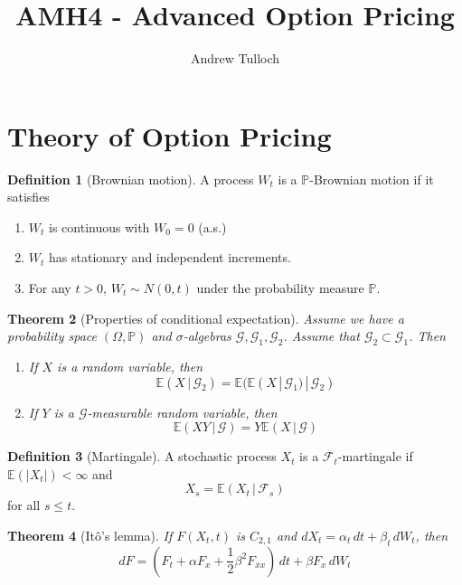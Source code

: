 \documentclass[10pt, oneside, reqno]{amsart}
\title{AMH4 - Advanced Option Pricing}                              %
\author{Andrew Tulloch}
\theoremstyle{plain}%
\newtheorem{thm}{Theorem}[section]
\numberwithin{equation}{section}
\theoremstyle{definition}
\newtheorem{defn}[thm]{Definition}
\theoremstyle{remark}
\newcommand{\given}{ \, | \,}
\newcommand{\sigf}{\mathcal{F}}
\newcommand{\E}{\mathbb{E}}
\renewcommand{\P}{\mathbb{P}}
\newcommand{\sigg}{\mathcal{G}}
\begin{document}
\maketitle \tableofcontents \clearpage



\section{Theory of Option Pricing} %
\label{sec:theory_of_option_pricing}
\begin{defn}[Brownian motion]
    A process $W_t$ is a $\P$-Brownian motion if it satisfies
    \begin{enumerate}
        \item $W_t$ is continuous with $W_0 = 0$ (a.s.)
        \item $W_t$ has stationary and independent increments.
        \item For any $t > 0$, $W_t \sim N(0, t)$ under the probability measure $\P$.
    \end{enumerate}
\end{defn}

\begin{thm}[Properties of conditional expectation]
    Assume we have a probability space $(\Omega, \P)$ and $\sigma$-algebras $\sigg, \sigg_1, \sigg_2$.  Assume that $\sigg_2 \subset \sigg_1$.  Then 
    \begin{enumerate}
        \item If $X$ is a random variable, then \[
            \E(X \given \sigg_2) = \E( \E(X \given \sigg_1) \given \sigg_2)
        \]
        \item If $Y$ is a $\sigg$-measurable random variable, then \[
            \E(XY \given \sigg) = Y \E(X \given \sigg)
        \]
    \end{enumerate}
\end{thm}
\begin{defn}[Martingale]
    A stochastic process $X_t$ is a $\sigf_t$-martingale if $\E(|X_t|) < \infty$ and \[
        X_s = \E(X_t \given \sigf_s)
    \] for all $s \leq t$.
\end{defn}

\begin{thm}[It\^o's lemma]
    If $F(X_t, t)$ is $C_{2,1}$ and $dX_t = \alpha_t \, dt + \beta_t \, dW_t$, then \[
        dF = (F_t + \alpha F_x + \frac{1}{2}\beta^2 F_{xx}) \, dt + \beta F_x \, dW_t 
    \]
\end{thm}
\end{document}
